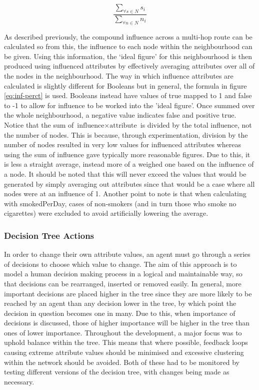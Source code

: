 \documentclass[]{report}
\begin{document}
\begin{equation}
\label{eq:inf-perct}
\frac{\sum_{\forall s \in N} s_{i}}{\sum_{\forall n \in N} n_{i}}
\end{equation}

As described previously, the compound influence across a multi-hop route can be calculated so from this, the influence to each node within the neighbourhood can be given. Using this information, the `ideal figure' for this neighbourhood is then produced using influenced attributes by effectively averaging attributes over all of the nodes in the neighbourhood. The way in which influence attributes are calculated is slightly different for Booleans but in general, the formula in figure \ref{eq:inf-perct} is used. Booleans instead have values of true mapped to 1 and false to -1 to allow for influence to be worked into the 'ideal figure'. Once summed over the whole neighbourhood, a negative value indicates false and positive true. Notice that the sum of $\text{influence} \times \text{attribute}$ is divided by the total influence, not the number of nodes. This is because, through experimentation, division by the number of nodes resulted in very low values for influenced attributes whereas using the sum of influence gave typically more reasonable figures. Due to this, it is less a straight average, instead more of a weighed one based on the influence of a node. It should be noted that this will never exceed the values that would be generated by simply averaging out attributes since that would be a case where all nodes were at an influence of 1. Another point to note is that when calculating with smokedPerDay, cases of non-smokers (and in turn those who smoke no cigarettes) were excluded to avoid artificially lowering the average.

\label{sec:neighbourhood}
\subsubsection{Decision Tree Actions}
\label{sec:dectree}
In order to change their own attribute values, an agent must go through a series of decisions to choose which value to change. The aim of this approach is to model a human decision making process in a logical and maintainable way, so that decisions can be rearranged, inserted or removed easily. In general, more important decisions are placed higher in the tree since they are more likely to be reached by an agent than any decision lower in the tree, by which point the decision in question becomes one in many. Due to this, when importance of decisions is discussed, those of higher importance will be higher in the tree than ones of lower importance. Throughout the development, a major focus was to uphold balance within the tree. This means that where possible, feedback loops causing extreme attribute values should be minimised and excessive clustering within the network should be avoided. Both of these had to be monitored by testing different versions of the decision tree, with changes being made as necessary.
\end{document}
